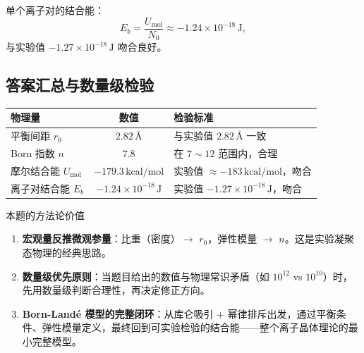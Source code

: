 单个离子对的结合能：
\[
  E_b = \frac{U_{\text{mol}}}{N_0}
      \approx -1.24\times 10^{-18}\,\mathrm{J},
\]
与实验值 $-1.27\times 10^{-18}\,\mathrm{J}$ 吻合良好。

\subsection{答案汇总与数量级检验}

\begin{center}
\renewcommand{\arraystretch}{1.5}
\begin{tabular}{|l|c|l|}
\hline
\textbf{物理量} & \textbf{数值} & \textbf{检验标准} \\
\hline
平衡间距 $r_0$ & $2.82\,\text{\AA}$ & 与实验值 $2.82\,\text{\AA}$ 一致 \\
Born 指数 $n$ & $7.8$ & 在 $7\sim 12$ 范围内，合理 \\
摩尔结合能 $U_{\text{mol}}$ & $-179.3\,\mathrm{kcal/mol}$ & 实验值 $\approx -183\,\mathrm{kcal/mol}$，吻合 \\
离子对结合能 $E_b$ & $-1.24\times 10^{-18}\,\mathrm{J}$ & 实验值 $-1.27\times 10^{-18}\,\mathrm{J}$，吻合 \\
\hline
\end{tabular}
\end{center}

\begin{insightbox}{本题的方法论价值}
\begin{enumerate}[nosep]
  \item \textbf{宏观量反推微观参量}：比重（密度）$\to$ $r_0$，弹性模量 $\to$ $n$。这是实验凝聚态物理的经典思路。
  \item \textbf{数量级优先原则}：当题目给出的数值与物理常识矛盾（如 $10^{12}$ vs $10^{10}$）时，先用数量级判断合理性，再决定修正方向。
  \item \textbf{Born-Land\'{e} 模型的完整闭环}：从库仑吸引 + 幂律排斥出发，通过平衡条件、弹性模量定义，最终回到可实验检验的结合能——整个离子晶体理论的最小完整模型。
\end{enumerate}
\end{insightbox}

